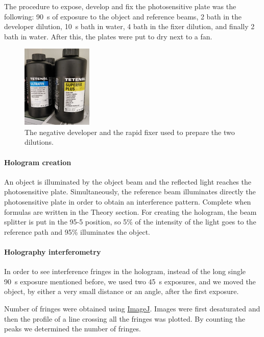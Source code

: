 \documentclass[11pt,a4paper]{article}
\begin{document}
The procedure to expose, develop and fix the photosensitive plate was the following: \SI{90}{\second} of exposure to the object and reference beams, \SI{2}{\min} bath in the developer dilution, \SI{10}{\second} bath in water, \SI{4}{\min} bath in the fixer dilution, and finally \SI{2}{\min} bath in water. After this, the plates were put to dry next to a fan.

\begin{figure}[ht]
\centering
\includegraphics[width=0.3\textwidth]{Chemicals}
\caption{The negative developer and the rapid fixer used to prepare the two dilutions.}
\label{fig:chemicals}
\end{figure}

\paragraph{Hologram creation}
An object is illuminated by the object beam and the reflected light reaches the photosensitive plate. Simultaneously, the reference beam illuminates directly the photosensitive plate in order to obtain an interference pattern. {\color{red}Complete when formulas are written in the Theory section.} For creating the hologram, the beam splitter is put in the 95-5 position, so 5\% of the intensity of the light goes to the reference path and 95\% illuminates the object.

\paragraph{Holography interferometry}
In order to see interference fringes in the hologram, instead of the long single \SI{90}{\second} exposure mentioned before, we used two \SI{45}{\second} exposures, and we moved the object, by either a very small distance or an angle, after the first exposure.

Number of fringes were obtained using \href{https://imagej.net/}{ImageJ}. Images were first desaturated and then the profile of a line crossing all the fringes was plotted. By counting the peaks we determined the number of fringes.
\end{document}
